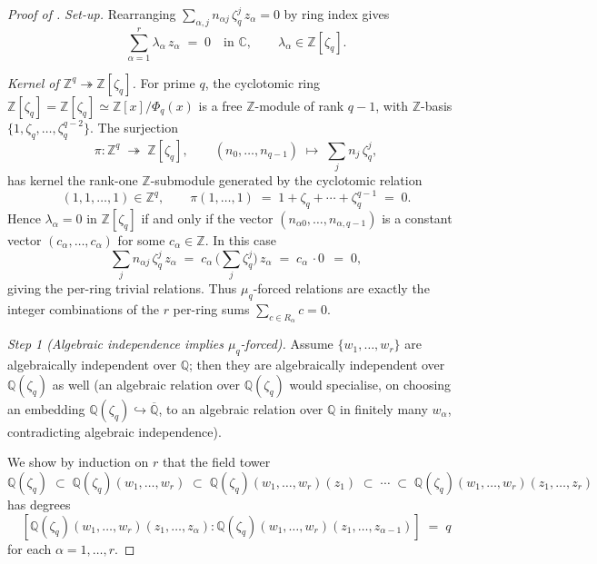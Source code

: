 \documentclass[11pt,a4paper]{article}
\theoremstyle{plain}
\theoremstyle{definition}
\theoremstyle{remark}
\newcommand{\Zlc}{\mathbb{Z}[\zeta_q]}
\newcommand{\Qlc}{\mathbb{Q}(\zeta_q)}
\begin{document}
\begin{proof}[Proof of ]
\textit{Set-up.}
Rearranging $\sum_{\alpha, j} n_{\alpha j}\, \zeta_q^j\, z_\alpha = 0$
by ring index gives
\begin{equation}\label{eq:D2-rearranged}
   \sum_{\alpha = 1}^{r} \lambda_\alpha\, z_\alpha \;=\; 0
   \quad \text{in } \mathbb{C},
   \qquad \lambda_\alpha \in \Zlc.
\end{equation}

\smallskip
\textit{Kernel of $\mathbb{Z}^q \twoheadrightarrow \Zlc$.}
For prime $q$, the cyclotomic ring $\Zlc = \mathbb{Z}[\zeta_q] \simeq
\mathbb{Z}[x] / \Phi_q(x)$ is a free $\mathbb{Z}$-module of rank
$q - 1$, with $\mathbb{Z}$-basis $\{1, \zeta_q, \dots, \zeta_q^{q-2}\}$.
The surjection
\[
   \pi \colon \mathbb{Z}^{q} \;\twoheadrightarrow\; \Zlc,
   \qquad
   (n_0, \dots, n_{q-1}) \;\longmapsto\; \sum_j n_j\, \zeta_q^j,
\]
has kernel the rank-one $\mathbb{Z}$-submodule generated by the
cyclotomic relation
\[
   (1, 1, \dots, 1) \in \mathbb{Z}^q,
   \qquad
   \pi(1, \dots, 1) \;=\; 1 + \zeta_q + \cdots + \zeta_q^{q-1}
   \;=\; 0.
\]
Hence $\lambda_\alpha = 0$ in $\Zlc$ if and only if the vector
$(n_{\alpha 0}, \dots, n_{\alpha, q-1})$ is a constant vector
$(c_\alpha, \dots, c_\alpha)$ for some $c_\alpha \in \mathbb{Z}$.
In this case
\[
   \sum_{j} n_{\alpha j}\, \zeta_q^j\, z_\alpha
   \;=\;
   c_\alpha\, \Big(\sum_j \zeta_q^j\Big)\, z_\alpha
   \;=\;
   c_\alpha\, \cdot 0\,
   \;=\; 0,
\]
giving the per-ring trivial relations. Thus $\mu_q$-forced relations
are exactly the integer combinations of the $r$ per-ring sums
$\sum_{c \in R_\alpha} c = 0$.

\smallskip
\textit{Step 1 (Algebraic independence implies $\mu_q$-forced).}
Assume $\{w_1, \dots, w_r\}$ are algebraically independent over
$\mathbb{Q}$; then they are algebraically independent over
$\Qlc$ as well (an algebraic relation over $\Qlc$ would specialise,
on choosing an embedding $\Qlc \hookrightarrow \overline{\mathbb{Q}}$,
to an algebraic relation over $\mathbb{Q}$ in finitely many
$w_\alpha$, contradicting algebraic independence).

We show by induction on $r$ that the field tower
\begin{equation}\label{eq:D2-tower}
   \Qlc \;\subset\; \Qlc(w_1, \dots, w_r)
   \;\subset\; \Qlc(w_1, \dots, w_r)(z_1)
   \;\subset\; \cdots
   \;\subset\; \Qlc(w_1, \dots, w_r)(z_1, \dots, z_r)
\end{equation}
has degrees
\[
   [\Qlc(w_1, \dots, w_r)(z_1, \dots, z_\alpha) :
   \Qlc(w_1, \dots, w_r)(z_1, \dots, z_{\alpha - 1})] \;=\; q
\]
for each $\alpha = 1, \dots, r$.


\end{proof}
\end{document}
